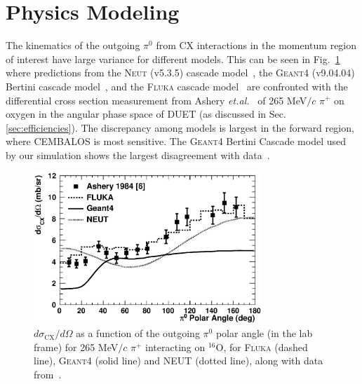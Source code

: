 \section{Physics Modeling}\label{sec:physics}
{\color{red}The kinematics of the outgoing $\pi^0$ from CX interactions in the momentum region of interest have large variance for different models. This can be seen in Fig.~\ref{fig:pi0kinem} where predictions from the \textsc{Neut} (v5.3.5) cascade model~\cite{NEUT}, the \textsc{Geant4} (v9.04.04) Bertini cascade model~\cite{bertini}, and the \textsc{Fluka} cascade model~\cite{fluka1,fluka2} are confronted with the differential cross section measurement from Ashery \textit{et.al.}~\cite{Ashery2} of 265 MeV$/c$ $\pi^{+}$ on oxygen in the angular phase space of DUET (as discussed in Sec. \ref{sec:efficiencies}).} The discrepancy among models is largest in the forward region, where CEMBALOS is most sensitive. The \textsc{Geant4} Bertini Cascade model used by our simulation shows the largest disagreement with data~\cite{Ashery2}.

\begin{figure}[h]
 \includegraphics[width=86mm]{figures/dsigma_cx_o16_data_and_models.eps}
 \caption{$d\sigma_{\mathrm{CX}}/d\Omega$ as a function of the outgoing $\pi^0$ polar angle (in the lab frame) for 265 MeV$/c$ $\pi^{+}$ interacting on $^{16}$O, for \textsc{Fluka} (dashed line), \textsc{Geant4} (solid line) and \textsc{NEUT} (dotted line), along with data from~\cite{Ashery2}.}
 \label{fig:pi0kinem}
\end{figure}

